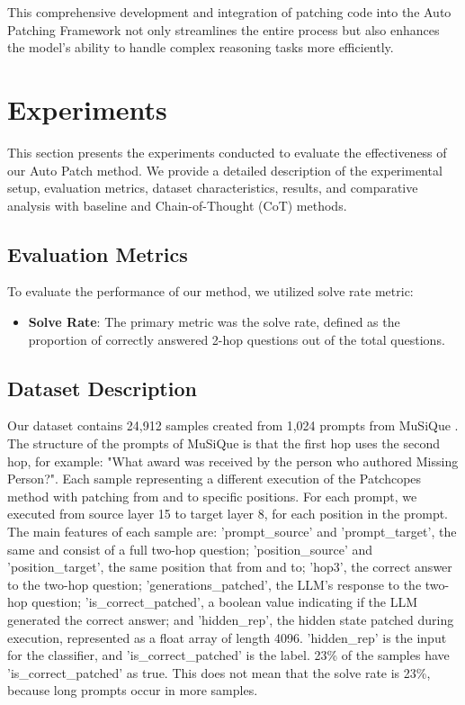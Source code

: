 \documentclass[11pt]{article}
\begin{document}
This comprehensive development and integration of patching code into the Auto Patching Framework not only streamlines the entire process but also enhances the model’s ability to handle complex reasoning tasks more efficiently.


\section{Experiments}

This section presents the experiments conducted to evaluate the effectiveness of our Auto Patch method. We provide a detailed description of the experimental setup, evaluation metrics, dataset characteristics, results, and comparative analysis with baseline and Chain-of-Thought (CoT) methods.

\subsection{Evaluation Metrics}

To evaluate the performance of our method, we utilized solve rate metric:

\begin{itemize}
    \item \textbf{Solve Rate}: The primary metric was the solve rate, defined as the proportion of correctly answered 2-hop questions out of the total questions.
\end{itemize}

\subsection{Dataset Description}
Our dataset contains 24,912 samples created from 1,024 prompts from MuSiQue \cite{deldjoo2021musique}. The structure of the prompts of MuSiQue is that the first hop uses the second hop, for example: "What award was received by the person who authored Missing Person?". Each sample representing a different execution of the Patchcopes method with patching from and to specific positions. For each prompt, we executed from source layer 15 to target layer 8, for each position in the prompt. The main features of each sample are: 'prompt\_source' and 'prompt\_target', the same and consist of a full two-hop question; 'position\_source' and 'position\_target', the same position that from and to; 'hop3', the correct answer to the two-hop question; 'generations\_patched', the LLM's response to the two-hop question; 'is\_correct\_patched', a boolean value indicating if the LLM generated the correct answer; and 'hidden\_rep', the hidden state patched during execution, represented as a float array of length 4096. 'hidden\_rep' is the input for the classifier, and 'is\_correct\_patched' is the label.
23\% of the samples have 'is\_correct\_patched' as true. This does not mean that the solve rate is 23\%, because long prompts occur in more samples.
\end{document}
